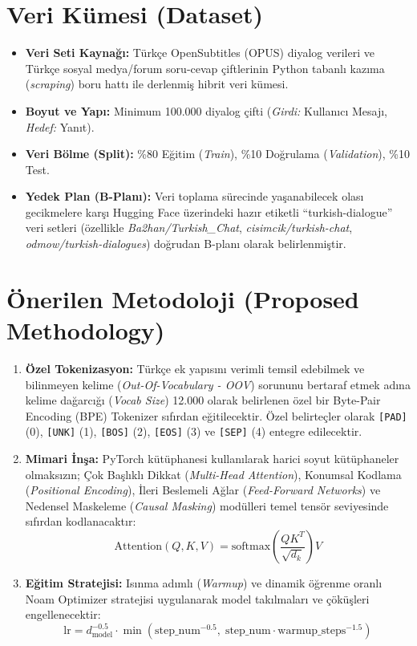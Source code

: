 \documentclass[11pt,a4paper]{article}
\begin{document}
\section{Veri Kümesi (Dataset)}
\begin{itemize}
    \item \textbf{Veri Seti Kaynağı:} Türkçe OpenSubtitles (OPUS) diyalog verileri ve Türkçe sosyal medya/forum soru-cevap çiftlerinin Python tabanlı kazıma (\textit{scraping}) boru hattı ile derlenmiş hibrit veri kümesi.
    \item \textbf{Boyut ve Yapı:} Minimum 100.000 diyalog çifti (\textit{Girdi:} Kullanıcı Mesajı, \textit{Hedef:} Yanıt).
    \item \textbf{Veri Bölme (Split):} \%80 Eğitim (\textit{Train}), \%10 Doğrulama (\textit{Validation}), \%10 Test.
    \item \textbf{Yedek Plan (B-Planı):} Veri toplama sürecinde yaşanabilecek olası gecikmelere karşı Hugging Face üzerindeki hazır etiketli ``turkish-dialogue'' veri setleri (özellikle \textit{Ba2han/Turkish\_Chat}, \textit{cisimcik/turkish-chat}, \textit{odmow/turkish-dialogues}) doğrudan B-planı olarak belirlenmiştir.
\end{itemize}

\section{Önerilen Metodoloji (Proposed Methodology)}
\begin{enumerate}
    \item \textbf{Özel Tokenizasyon:} Türkçe ek yapısını verimli temsil edebilmek ve bilinmeyen kelime (\textit{Out-Of-Vocabulary - OOV}) sorununu bertaraf etmek adına kelime dağarcığı (\textit{Vocab Size}) 12.000 olarak belirlenen özel bir Byte-Pair Encoding (BPE) Tokenizer sıfırdan eğitilecektir. Özel belirteçler olarak \texttt{[PAD]} (0), \texttt{[UNK]} (1), \texttt{[BOS]} (2), \texttt{[EOS]} (3) ve \texttt{[SEP]} (4) entegre edilecektir.
    
    \item \textbf{Mimari İnşa:} PyTorch kütüphanesi kullanılarak harici soyut kütüphaneler olmaksızın; Çok Başlıklı Dikkat (\textit{Multi-Head Attention}), Konumsal Kodlama (\textit{Positional Encoding}), İleri Beslemeli Ağlar (\textit{Feed-Forward Networks}) ve Nedensel Maskeleme (\textit{Causal Masking}) modülleri temel tensör seviyesinde sıfırdan kodlanacaktır:
    \begin{equation}
        \text{Attention}(Q, K, V) = \text{softmax}\left(\frac{QK^T}{\sqrt{d_k}}\right)V
    \end{equation}
    
    \item \textbf{Eğitim Stratejisi:} Isınma adımlı (\textit{Warmup}) ve dinamik öğrenme oranlı Noam Optimizer stratejisi uygulanarak model takılmaları ve çöküşleri engellenecektir:
    \begin{equation}
        \text{lr} = d_{\text{model}}^{-0.5} \cdot \min\left(\text{step\_num}^{-0.5}, \;\text{step\_num} \cdot \text{warmup\_steps}^{-1.5}\right)
    \end{equation}
\end{enumerate}
\end{document}
